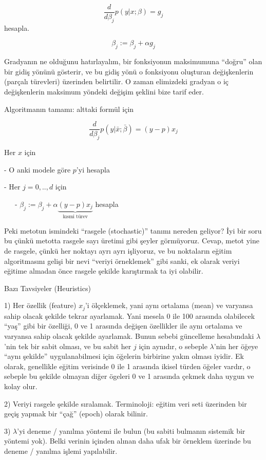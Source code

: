 \documentclass[12pt,fleqn]{article}\usepackage{../../common}
\begin{document}
$$ \frac{d}{d\beta_j}p(y|x;\beta) = g_j$$ hesapla. 

$$ \beta_j := \beta_j + \alpha g_j $$

Gradyanın ne olduğunu hatırlayalım, bir fonksiyonun maksimumuna ``doğru''
olan bir gidiş yönünü gösterir, ve bu gidiş yönü o fonksiyonu oluşturan
değişkenlerin (parçalı türevleri) üzerinden belirtilir. O zaman elimizdeki
gradyan o iç değişkenlerin maksimum yöndeki değişim şeklini bize tarif
eder. 

Algoritmanın tamamı: alttaki formül için

$$ \frac{d}{d\beta_j}p(y|\bar{x};\bar{\beta}) = (y-p)x_j $$

Her $x$ için

- O anki modele göre $p$'yi hesapla

- Her $j = 0,..,d$ için

\ \ \ - $ \beta_j := \beta_j + \alpha \underbrace{ (y-p) x_j}_{\textrm{kısmi türev}} $ hesapla
  
Peki metotun ismindeki ``rasgele (stochastic)'' tanımı nereden geliyor? İyi
bir soru bu çünkü metotta rasgele sayı üretimi gibi şeyler
görmüyoruz. Cevap, metot yine de rasgele, çünkü her noktayı ayrı ayrı
işliyoruz, ve bu noktaların eğitim algoritmasını gelişi bir nevi ``veriyi
örneklemek'' gibi sanki, ek olarak veriyi eğitime almadan önce rasgele
şekilde karıştırmak ta iyi olabilir. 

Bazı Tavsiyeler (Heuristics)

1) Her özellik (feature) $x_j$'i ölçeklemek, yani aynı ortalama (mean) ve
varyansa sahip olacak şekilde tekrar ayarlamak. Yani mesela 0 ile 100
arasında olabilecek ``yaş'' gibi bir özelliği, 0 ve 1 arasında değişen
özellikler ile aynı ortalama ve varyansa sahip olacak şekilde
ayarlamak. Bunun sebebi güncelleme hesabındaki $\lambda$'nin tek bir sabit
olması, ve bu sabit her $j$ için aynıdır, o sebeple $\lambda$'nin her öğeye
``aynı şekilde'' uygulanabilmesi için öğelerin birbirine yakın olması
iyidir. Ek olarak, genellikle eğitim verisinde 0 ile 1 arasında ikisel
türden öğeler vardır, o sebeple bu şekilde olmayan diğer ögeleri 0 ve 1
arasında çekmek daha uygun ve kolay olur.

2) Veriyi rasgele şekilde sıralamak. Terminoloji: eğitim veri seti
üzerinden bir geçiş yapmak bir ``çağ'' (epoch) olarak bilinir. 

3) $\lambda$'yi deneme / yanılma yöntemi ile bulun (bu sabiti bulmanın
sistemik bir yöntemi yok). Belki verinin içinden alınan daha ufak bir
örneklem üzerinde bu deneme / yanılma işlemi yapılabilir.
\end{document}

